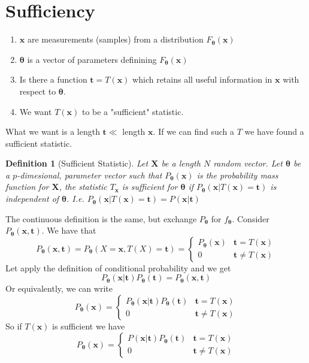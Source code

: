 \documentclass[a4paper]{article}
\newtheorem*{defn}{Definition}
\begin{document}
\section*{Sufficiency}
\begin{enumerate}
  \item $\mathbf{x}$ are measurements (samples) from a distribution $F_{\bm{\theta}}(\mathbf{x})$
  \item $\bm{\theta}$ is a vector of parameters definining $F_{\bm{\theta}}(\mathbf{x})$
  \item Is there a function $\mathbf{t} = T(\mathbf{x})$ which  retains all useful information in $\mathbf{x}$ with respect to $\bm{\theta}$.
  \item We want $T(\mathbf{x})$ to be a "sufficient" statistic.
\end{enumerate}
What we want is a length $\mathbf{t} \ll$ length $\mathbf{x}$. If we can find such a $T$ we have found a sufficient statistic. 

\begin{defn}[Sufficient Statistic]
  Let $\mathbf{X}$ be a length $N$ random vector. Let $\bm{\theta}$ be a $p$-dimesional, parameter vector such that $P_{\bm{\theta}}(\mathbf{x})$ is the probability mass function for $\mathbf{X}$, the statistic $T_{\mathbf{x}}$ is sufficient for $\bm{\theta}$ if $P_{\bm{\theta}}(\mathbf{x} | T(\mathbf{x}) = \mathbf{t})$ is independent of $\bm{\theta}$. I.e.  $P_{\bm{\theta}}(\mathbf{x} | T(\mathbf{x}) = \mathbf{t}) = P(\mathbf{x} | \mathbf{t})$
\end{defn}
The continuous definition is the same, but exchange $P_{\bm{\theta}}$ for $f_{\bm{\theta}}$.
Consider $P_{\bm{\theta}}(\mathbf{x}, \mathbf{t})$. We have that
\[
P_{\bm{\theta}}(\mathbf{x}, \mathbf{t}) = P_{\bm{\theta}}(X = \mathbf{x}, T(X) = \mathbf{t}) = 
\begin{cases}
  P_{\bm{\theta}}(\mathbf{x}) & \mathbf{t} = T(\mathbf{x}) \\
  0 & \mathbf{t} \neq T(\mathbf{x})
\end{cases}
\]
Let apply the definition of conditional probability and we get
\[
  P_{\bm{\theta}}(\mathbf{x}|\mathbf{t})P_{\bm{\theta}}(\mathbf{t}) = P_{\bm{\theta}}(\mathbf{x}, \mathbf{t})
\]
Or equivalently, we can write
\[
  P_{\bm{\theta}}(\mathbf{x}) =  
\begin{cases}
  P_{\bm{\theta}}(\mathbf{x}|\mathbf{t})P_{\bm{\theta}}(\mathbf{t})  & \mathbf{t} = T(\mathbf{x}) \\
  0 & \mathbf{t} \neq T(\mathbf{x})
\end{cases}
\]
So if $T(\mathbf{x})$ is sufficient we have 
\[
  P_{\bm{\theta}}(\mathbf{x}) =  
\begin{cases}
  P(\mathbf{x}|\mathbf{t})P_{\bm{\theta}}(\mathbf{t})  & \mathbf{t} = T(\mathbf{x}) \\
  0 & \mathbf{t} \neq T(\mathbf{x})
\end{cases}
\]
\end{document}
